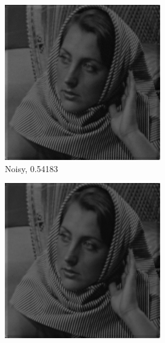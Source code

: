 \documentclass[a4paper]{article}
\begin{document}
\begin{figure}[H]
    \centering
    \begin{subfigure}{0.24\linewidth}
        \centering
        \includegraphics[width = \linewidth]{haarWavelet/barbara256 reconstructed using compressive measurements, with noise.png}
        \caption{Noisy, 0.54183}
    \end{subfigure}
    \begin{subfigure}{0.24\linewidth}
        \centering
        \includegraphics[width = \linewidth]{haarWavelet/barbara256 reconstructed using compressive measurements, without noise.png}

\end{subfigure}
\end{figure}
\end{document}
